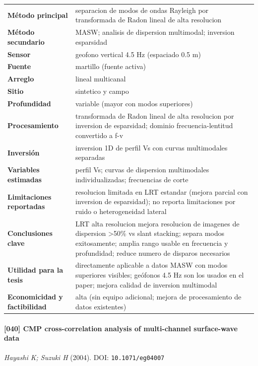 \begin{center}\scriptsize
\begin{tabularx}{\textwidth}{@{}>{\bfseries}p{3.3cm} X@{}}
\toprule
M\'etodo principal & separacion de modos de ondas Rayleigh por transformada de Radon lineal de alta resolucion \\
M\'etodo secundario & MASW; analisis de dispersion multimodal; inversion esparsidad \\
Sensor & geofono vertical 4.5 Hz (espaciado 0.5 m) \\
Fuente & martillo (fuente activa) \\
Arreglo & lineal multicanal \\
Sitio & sintetico y campo \\
Profundidad & variable (mayor con modos superiores) \\
Procesamiento & transformada de Radon lineal de alta resolucion por inversion de esparsidad; dominio frecuencia-lentitud convertido a f-v \\
Inversi\'on & inversion 1D de perfil Vs con curvas multimodales separadas \\
Variables estimadas & perfil Vs; curvas de dispersion multimodales individualizadas; frecuencias de corte \\
Limitaciones reportadas & resolucion limitada en LRT estandar (mejora parcial con inversion de esparsidad); no reporta limitaciones por ruido o heterogeneidad lateral \\
Conclusiones clave & LRT alta resolucion mejora resolucion de imagenes de dispersion >50\% vs slant stacking; separa modos exitosamente; amplia rango usable en frecuencia y profundidad; reduce numero de disparos necesarios \\
Utilidad para la tesis & directamente aplicable a datos MASW con modos superiores visibles; geófonos 4.5 Hz son los usados en el paper; mejora calidad de inversion multimodal \\
Economicidad y factibilidad & alta (sin equipo adicional; mejora de procesamiento de datos existentes) \\
\bottomrule
\end{tabularx}
\end{center}

\paragraph{[040] CMP cross-correlation analysis of multi-channel surface-wave data} \emph{Hayashi K; Suzuki H} (2004).
{\scriptsize DOI: \texttt{10.1071/eg04007}}

